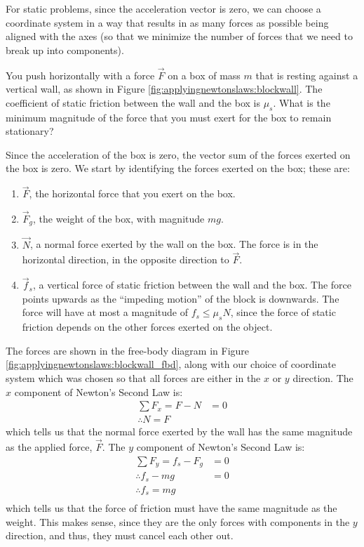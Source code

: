 For static problems, since the acceleration vector is zero, we can choose a coordinate system in a way that results in as many forces as possible being aligned with the axes (so that we minimize the number of forces that we need to break up into components).

\begin{example}{You push horizontally with a force $\vec F$ on a box of mass $m$ that is resting against a vertical wall, as shown in Figure \ref{fig:applyingnewtonslaws:blockwall}. The coefficient of static friction between the wall and the box is $\mu_s$. What is the minimum magnitude of the force that you must exert for the box to remain stationary?}

Since the acceleration of the box is zero, the vector sum of the forces exerted on the box is zero. We start by identifying the forces exerted on the box; these are:
\begin{enumerate}
\item $\vec F$, the horizontal force that you exert on the box.
\item $\vec F_g$, the weight of the box, with magnitude $mg$.
\item $\vec N$, a normal force exerted by the wall on the box. The force is in the horizontal direction, in the opposite direction to $\vec F$.
\item $\vec f_s$, a vertical force of static friction between the wall and the box. The force points upwards as the ``impeding motion'' of the block is downwards. The force will have at most a magnitude of $f_s\leq\mu_s N$, since the force of static friction depends on the other forces exerted on the object.
\end{enumerate}
The forces are shown in the free-body diagram in Figure \ref{fig:applyingnewtonslaws:blockwall_fbd}, along with our choice of coordinate system which was chosen so that all forces are either in the $x$ or $y$ direction. 
The $x$ component of Newton's Second Law is:
\begin{align*}
\sum F_x = F - N &=0\\
\therefore N = F
\end{align*}
which tells us that the normal force exerted by the wall has the same magnitude as the applied force, $\vec F$. The $y$ component of Newton's Second Law is:
\begin{align*}
\sum F_y = f_s - F_g &=0\\
\therefore f_s -mg &=0\\
\therefore f_s = mg\\
\end{align*}
which tells us that the force of friction must have the same magnitude as the weight. This makes sense, since they are the only forces with components in the $y$ direction, and thus, they must cancel each other out. 


\end{example}
